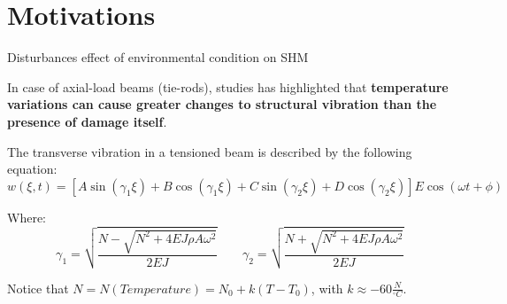 \section{Motivations}

\begin{frame}{Disturbances effect of environmental condition on SHM}

    In case of axial-load beams (tie-rods), studies has highlighted that \textbf{temperature variations can cause greater changes to structural vibration than the presence of damage itself}.

    The transverse vibration in a tensioned beam is described by the following equation\footnotemark[1]:
    \begin{equation}
        w(\xi, t) = \left[ A \sin(\gamma_1 \xi) + B \cos(\gamma_1 \xi) + C \sin(\gamma_2 \xi) + D \cos(\gamma_2 \xi)\right] E \cos(\omega t + \phi)
    \end{equation}

    Where:
    \begin{equation}
        \gamma_1 = \sqrt{\frac{N - \sqrt{N^2 + 4EJ \rho A \omega^2}}{2EJ}} \qquad \gamma_2 = \sqrt{\frac{N + \sqrt{N^2 + 4EJ \rho A \omega^2}}{2EJ}}
    \end{equation}

    Notice that $N = N(Temperature) = N_0 + k (T - T_0)$, with $k \approx -60 \frac{N}{^\circ C}$.


\end{frame}